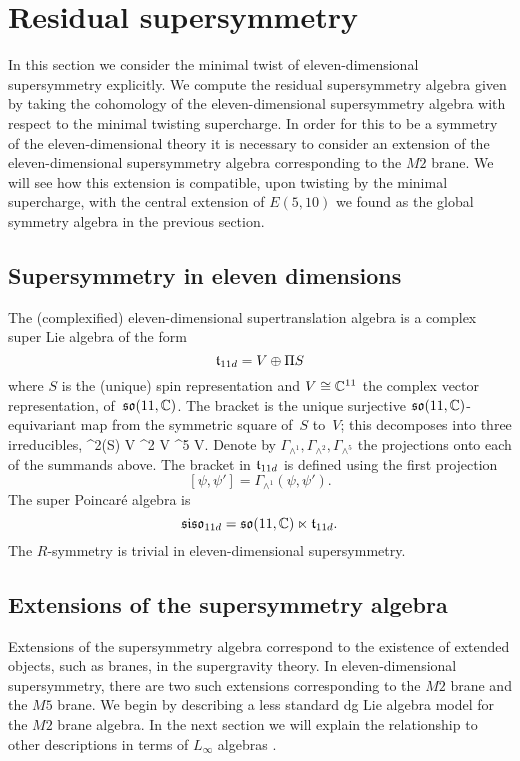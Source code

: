 \section{Residual supersymmetry} 
\label{sec:susy}

In this section we consider the minimal twist of eleven-dimensional supersymmetry explicitly. 
We compute the residual supersymmetry algebra given by taking the cohomology of the eleven-dimensional supersymmetry algebra with respect to the minimal twisting supercharge. 
In order for this to be a symmetry of the eleven-dimensional theory it is necessary to consider an extension of the eleven-dimensional supersymmetry algebra corresponding to the $M2$ brane.
We will see how this extension is compatible, upon twisting by the minimal supercharge, with the central extension of $E(5,10)$ we found as the global symmetry algebra in the previous section. 


\subsection{Supersymmetry in eleven dimensions}
\label{sec:11dsusy}

The (complexified) eleven-dimensional supertranslation algebra is a complex super Lie algebra of the form
\[
  \mathfrak t_{11d} = V \oplus \Pi S
\]
where $S$ is the (unique) spin representation and $V \cong \mathbb C^{11}$ the complex vector representation, of~$\mathfrak{so}(11, \mathbb C)$. 
The bracket is the unique surjective $\mathfrak{so}(11,\mathbb C)$-equivariant map from the symmetric square of~$S$ to~$V$;
this decomposes into three irreducibles, 
\beqn\label{eqn:decomp}
  \Sym^2(S) \cong V \oplus \wedge^2 V \oplus \wedge^5 V.
\eeqn
Denote by $\Gamma_{\wedge^1}, \Gamma_{\wedge^2}, \Gamma_{\wedge^5}$ the projections onto each of the summands above. 
The bracket in $\mathfrak t_{11d}$ is defined using the first projection
\[
[\psi, \psi'] = \Gamma_{\wedge^1} (\psi, \psi') .
\]
The super Poincar\'{e} algebra is
\[
  \mathfrak{siso}_{11d} = \mathfrak{so}(11 , \mathbb C) \ltimes \mathfrak t_{11d} .
\]
The $R$-symmetry is trivial in eleven-dimensional supersymmetry. 

\subsection{Extensions of the supersymmetry algebra} 
\label{sec:m2brane}

Extensions of the supersymmetry algebra correspond to the existence of extended objects, such as branes, in the supergravity theory.
In eleven-dimensional supersymmetry, there are two such extensions corresponding to the $M2$ brane and the $M5$ brane.
We begin by describing a less standard dg Lie algebra model for the $M2$ brane algebra.
In the next section we will explain the relationship to other descriptions in terms of $L_\infty$ algebras \cite{Basu_2005,Bagger_2007,fiorenza2015super}. 

